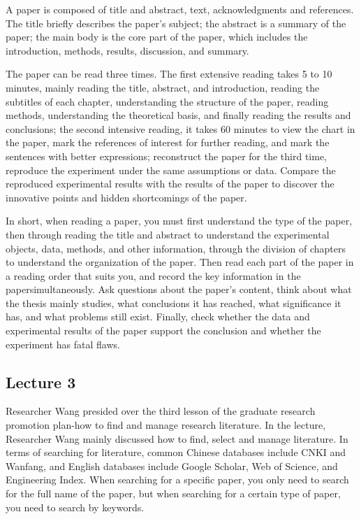\documentclass[UTF-8]{ctexart}
\begin{document}
A paper is composed of title and abstract, text, acknowledgments and references. The title briefly describes the paper's subject; the abstract is a summary of the paper; the main body is the core part of the paper, which includes the introduction, methods, results, discussion, and summary.

The paper can be read three times. The first extensive reading takes 5 to 10 minutes, mainly reading the title, abstract, and introduction, reading the subtitles of each chapter, understanding the structure of the paper, reading methods, understanding the theoretical basis, and finally reading the results and conclusions; the second intensive reading, it takes 60 minutes to view the chart in the paper, mark the references of interest for further reading, and mark the sentences with better expressions; reconstruct the paper for the third time, reproduce the experiment under the same assumptions or data. Compare the reproduced experimental results with the results of the paper to discover the innovative points and hidden shortcomings of the paper.

In short, when reading a paper, you must first understand the type of the paper, then through reading the title and abstract to understand the experimental objects, data, methods, and other information, through the division of chapters to understand the organization of the paper. Then read each part of the paper in a reading order that suits you, and record the key information in the papersimultaneously. Ask questions about the paper's content, think about what the thesis mainly studies, what conclusions it has reached, what significance it has, and what problems still exist. Finally, check whether the data and experimental results of the paper support the conclusion and whether the experiment has fatal flaws.

\subsection{Lecture 3}
Researcher Wang presided over the third lesson of the graduate research promotion plan-how to find and manage research literature. In the lecture, Researcher Wang mainly discussed how to find, select and manage literature.
In terms of searching for literature, common Chinese databases include CNKI and Wanfang, and English databases include Google Scholar, Web of Science, and Engineering Index. When searching for a specific paper, you only need to search for the full name of the paper, but when searching for a certain type of paper, you need to search by keywords.
\end{document}
